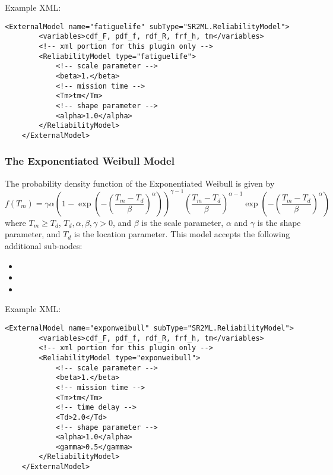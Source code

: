 Example XML:
\begin{lstlisting}[style=XML]
	<ExternalModel name="fatiguelife" subType="SR2ML.ReliabilityModel">
		<variables>cdf_F, pdf_f, rdf_R, frf_h, tm</variables>
		<!-- xml portion for this plugin only -->
		<ReliabilityModel type="fatiguelife">
			<!-- scale parameter -->
			<beta>1.</beta>
			<!-- mission time -->
			<Tm>tm</Tm>
			<!-- shape parameter -->
			<alpha>1.0</alpha>
		</ReliabilityModel>
	</ExternalModel>
\end{lstlisting}


\subsubsection{The Exponentiated Weibull Model}
The probability density function of the Exponentiated Weibull is given by
\begin{equation}
	f(T_m) = \gamma\alpha\left(1-\exp\left(-\left(\frac{T_m-T_d}{\beta}\right)^\alpha\right)\right)^{\gamma-1}
				 \left(\frac{T_m-T_d}{\beta}\right)^{\alpha-1}\exp\left(-\left(\frac{T_m-T_d}{\beta}\right)^\alpha\right)
\end{equation}
where $T_m\geq T_d$, $T_d, \alpha, \beta, \gamma>0$, and $\beta$ is the scale parameter, $\alpha$ and $\gamma$ is the shape
parameter, and $T_d$ is the location parameter.
This model accepts the following additional sub-nodes:
\begin{itemize}
	\item {}
	\item {}
	\item {}
\end{itemize}

Example XML:
\begin{lstlisting}[style=XML]
	<ExternalModel name="exponweibull" subType="SR2ML.ReliabilityModel">
		<variables>cdf_F, pdf_f, rdf_R, frf_h, tm</variables>
		<!-- xml portion for this plugin only -->
		<ReliabilityModel type="exponweibull">
			<!-- scale parameter -->
			<beta>1.</beta>
			<!-- mission time -->
			<Tm>tm</Tm>
			<!-- time delay -->
			<Td>2.0</Td>
			<!-- shape parameter -->
			<alpha>1.0</alpha>
			<gamma>0.5</gamma>
		</ReliabilityModel>
	</ExternalModel>
\end{lstlisting}


